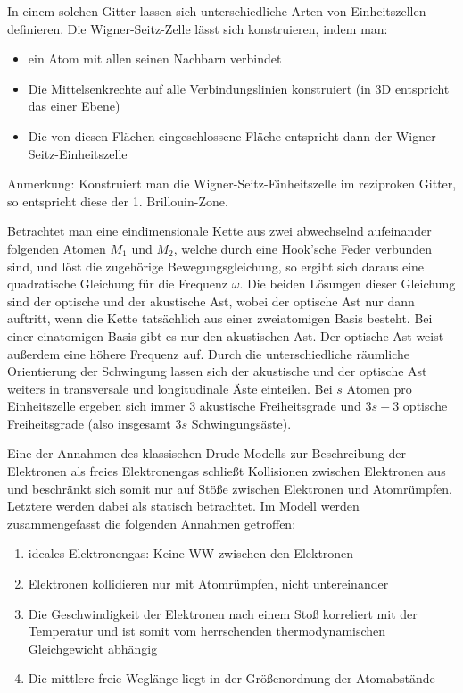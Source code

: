 In einem solchen Gitter lassen sich unterschiedliche Arten von Einheitszellen definieren. Die Wigner-Seitz-Zelle lässt sich konstruieren, indem man:
\begin{itemize}
    \item ein Atom mit allen seinen Nachbarn verbindet
    \item Die Mittelsenkrechte auf alle Verbindungslinien konstruiert (in 3D entspricht das einer Ebene)
    \item Die von diesen Flächen eingeschlossene Fläche entspricht dann der Wigner-Seitz-Einheitszelle
\end{itemize}
Anmerkung: Konstruiert man die Wigner-Seitz-Einheitszelle im reziproken Gitter, so entspricht diese der 1. Brillouin-Zone.

\label{q:55}

Betrachtet man eine eindimensionale Kette aus zwei abwechselnd aufeinander folgenden Atomen $M_1$ und $M_2$, welche durch eine Hook'sche Feder verbunden sind, und löst die zugehörige Bewegungsgleichung, so ergibt sich daraus eine quadratische Gleichung für die Frequenz $\omega$. Die beiden Lösungen dieser Gleichung sind der optische und der akustische Ast, wobei der optische Ast nur dann auftritt, wenn die Kette tatsächlich aus einer zweiatomigen Basis besteht. Bei einer einatomigen Basis gibt es nur den akustischen Ast. Der optische Ast weist außerdem eine höhere Frequenz auf. Durch die unterschiedliche räumliche Orientierung der Schwingung lassen sich der akustische und der optische Ast weiters in transversale und longitudinale Äste einteilen. Bei $s$ Atomen pro Einheitszelle ergeben sich immer $3$ akustische Freiheitsgrade und $3s-3$ optische Freiheitsgrade (also insgesamt $3s$ Schwingungsäste).

\label{q:56}

Eine der Annahmen des klassischen Drude-Modells zur Beschreibung der Elektronen als freies Elektronengas schließt Kollisionen zwischen Elektronen aus und beschränkt sich somit nur auf Stöße zwischen Elektronen und Atomrümpfen. Letztere werden dabei als statisch betrachtet. Im Modell werden zusammengefasst die folgenden Annahmen getroffen:

\begin{enumerate}
    \item ideales Elektronengas: Keine WW zwischen den Elektronen
    \item Elektronen kollidieren nur mit Atomrümpfen, nicht untereinander
    \item Die Geschwindigkeit der Elektronen nach einem Stoß korreliert mit der Temperatur und ist somit vom herrschenden thermodynamischen Gleichgewicht abhängig
    \item Die mittlere freie Weglänge liegt in der Größenordnung der Atomabstände
\end{enumerate}

